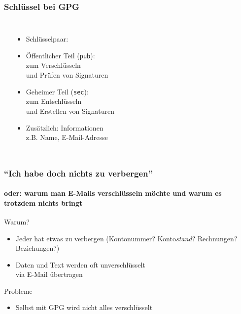 \documentclass{beamer}
\begin{document}
\begin{frame}
  \frametitle{Schlüssel bei GPG}
  \begin{columns}
    \begin{center}
    \end{center}
    \begin{itemize}
    \item Schlüsselpaar:
    \item Öffentlicher Teil (\texttt{pub}): \\zum Verschlüsseln \\und Prüfen von Signaturen
    \item Geheimer Teil (\texttt{sec}): \\zum Entschlüsseln \\und Erstellen von Signaturen
    \item Zusätzlich: Informationen \\z.B. Name, E-Mail-Adresse
    \end{itemize}
  \end{columns}
\end{frame}

\begin{frame}
  \frametitle{``Ich habe doch nichts zu verbergen''}
  \framesubtitle{oder: warum man E-Mails verschlüsseln möchte und warum es trotzdem nichts bringt}

  \begin{block}{Warum?}
    \begin{itemize}
    \item Jeder hat etwas zu verbergen (Kontonummer? Konto\emph{stand}?
      Rechnungen? Beziehungen?)
    \item Daten und Text werden oft unverschlüsselt\\via E-Mail übertragen
    \end{itemize}
  \end{block}
  \pause
  \begin{block}{Probleme}
    \begin{itemize}
    \item Selbst mit GPG wird nicht alles verschlüsselt
    \end{itemize}
  \end{block}
\end{frame}
\end{document}
